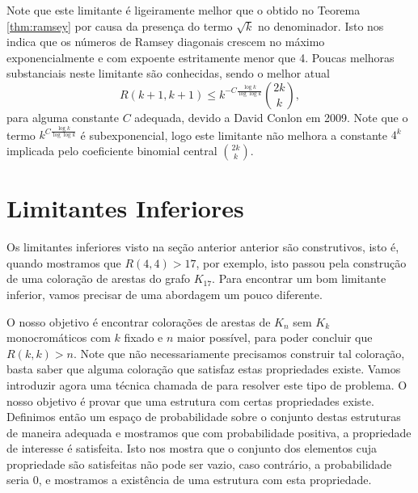 Note que este limitante é ligeiramente melhor que o obtido no Teorema \ref{thm:ramsey} por causa da presença do termo $\sqrt{k}$ no denominador. Isto nos indica que os números de Ramsey diagonais crescem no máximo exponencialmente e com expoente estritamente menor que 4. Poucas melhoras substanciais neste limitante são conhecidas, sendo o melhor atual
\[R(k+1,k+1) \leq k^{-C\frac{\log k}{\log \log k}} \binom{2k}{k},\]
para alguma constante $C$ adequada, devido a David Conlon em 2009\cite{conlon}. Note que o termo $k^{C\frac{\log k}{\log \log k}}$ é subexponencial, logo este limitante não melhora a constante $4^k$ implicada pelo coeficiente binomial central $\binom{2k}{k}$.


\section{Limitantes Inferiores}

Os limitantes inferiores visto na seção anterior anterior são construtivos, isto é, quando mostramos que $R(4,4) > 17$, por exemplo, isto passou pela construção de uma coloração de arestas do grafo $K_{17}$. Para encontrar um bom limitante inferior, vamos precisar de uma abordagem um pouco diferente.

O nosso objetivo é encontrar colorações de arestas de $K_n$ sem $K_k$ monocromáticos com $k$ fixado e $n$ maior possível, para poder concluir que $R(k,k) > n$. Note que não necessariamente precisamos construir tal coloração, basta saber que alguma coloração que satisfaz estas propriedades existe. Vamos introduzir agora uma técnica chamada de  para resolver este tipo de problema. O nosso objetivo é provar que uma estrutura com certas propriedades existe. Definimos então um espaço de probabilidade sobre o conjunto destas estruturas de maneira adequada e mostramos que com probabilidade positiva, a propriedade de interesse é satisfeita. Isto nos mostra que o conjunto dos elementos cuja propriedade são satisfeitas não pode ser vazio, caso contrário, a probabilidade seria 0, e mostramos a existência de uma estrutura com esta propriedade.

